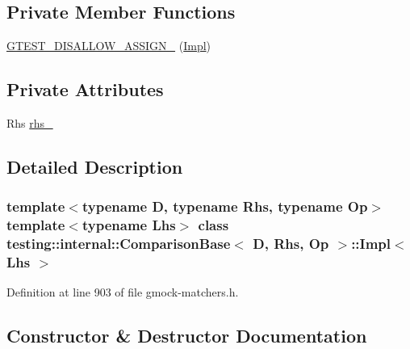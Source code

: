 \subsection*{Private Member Functions}
\begin{DoxyCompactItemize}
\item 
\hyperlink{classtesting_1_1internal_1_1ComparisonBase_1_1Impl_a0608dbd0b2bfda7e450cbc5547aa6e4c}{G\+T\+E\+S\+T\+\_\+\+D\+I\+S\+A\+L\+L\+O\+W\+\_\+\+A\+S\+S\+I\+G\+N\+\_\+} (\hyperlink{classtesting_1_1internal_1_1ComparisonBase_1_1Impl}{Impl})
\end{DoxyCompactItemize}
\subsection*{Private Attributes}
\begin{DoxyCompactItemize}
\item 
Rhs \hyperlink{classtesting_1_1internal_1_1ComparisonBase_1_1Impl_aa665caf1136e3a09f8019296ccbdea44}{rhs\+\_\+}
\end{DoxyCompactItemize}


\subsection{Detailed Description}
\subsubsection*{template$<$typename D, typename Rhs, typename Op$>$\newline
template$<$typename Lhs$>$\newline
class testing\+::internal\+::\+Comparison\+Base$<$ D, Rhs, Op $>$\+::\+Impl$<$ Lhs $>$}



Definition at line 903 of file gmock-\/matchers.\+h.



\subsection{Constructor \& Destructor Documentation}
\mbox{\label{classtesting_1_1internal_1_1ComparisonBase_1_1Impl_ab311039db40ab8b77361666be47c5e1a}} 

